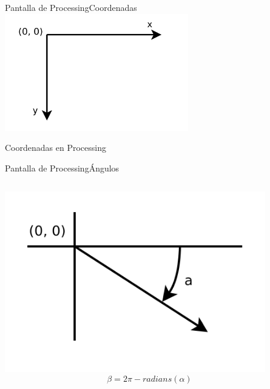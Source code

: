 \begin{frame}{Pantalla de Processing}{Coordenadas}
  \includegraphics [width=0.6\textwidth]{xyProcessing.png}

  Coordenadas en Processing
\end{frame}

\begin{frame}{Pantalla de Processing}{Ángulos}
  \begin{columns}
    \includegraphics [width=0.9\textwidth]{arcProcessing.png}
    \begin{equation*}
      \beta = 2\pi - radians(\alpha)
    \end{equation*}
  \end{columns}
\end{frame}





